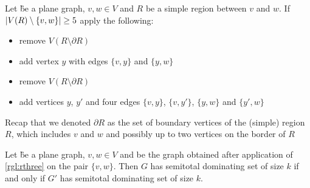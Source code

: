 \begin{rgl}\label{rgl:rthree}
    Let \G be a plane graph, $v, w \in V$ and $R$ be a simple region between $v$ and $w$. If $\abs{V(R) \setminus \{v, w\}} \geq 5$ apply the following:

    \begin{caseof}

            \vspace{-5mm}
            \begin{itemize}
                    \item remove $V(R\setminus\partial R)$
                    \item add vertex $y$ with edges $\{v, y\}$ and $\{y, w\}$
            \end{itemize}

            \vspace{-5mm}
            \begin{itemize}
                    \item remove $V(R\setminus\partial R)$
                    \item add vertices $y$, $y'$ and four edges $\{v,y\}$, $\{v, y'\}$, $\{y, w\}$ and $\{y', w\}$
            \end{itemize}
        \end{caseof}
Recap that we denoted $\partial R$ as the set of boundary vertices of the (simple) region $R$, which includes $v$ and $w$ and possibly up to two vertices on the border of $R$

\end{rgl}
\begin{lemma}\label{lemma:correctnessthree}
    Let \G be a plane graph, $v, w \in V$ and \GB be the graph obtained after application of \cref{rgl:rthree} on the pair $\{v, w\}$. Then $G$ has semitotal dominating set of size $k$ if and only if $G'$ has semitotal dominating set of size $k$.
\end{lemma}
